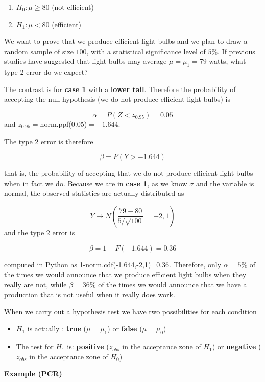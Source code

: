 \documentclass[
]{book}
\providecommand{\tightlist}{%
  \setlength{\itemsep}{0pt}\setlength{\parskip}{0pt}}
\begin{document}
\begin{enumerate}
\def\labelenumi{\alph{enumi}.}
\tightlist
\item
  \(H_0 : \mu \geq 80\) (not efficient)
\item
  \(H_1 : \mu < 80\) (efficient)
\end{enumerate}

We want to prove that we produce efficient light bulbs and we plan to draw a random sample of size \(100\), with a statistical significance level of \(5\%\). If previous studies have suggested that light bulbs may average \(\mu=\mu_1=79\) watts, what type 2 error do we expect?

The contrast is for \textbf{case 1} with a \textbf{lower tail}. Therefore the probability of accepting the null hypothesis (we do not produce efficient light bulbs) is

\[\alpha = P(Z< z_{0.95})=0.05\]
and \(z_{0.95}=\)norm.ppf(0.05)\(=-1.644\).

The type 2 error is therefore

\[\beta= P(Y > -1.644)\]

that is, the probability of accepting that we do not produce efficient light bulbs when in fact we do. Because we are in \textbf{case 1}, as we know \(\sigma\) and the variable is normal, the observed statistics are actually distributed as

\[Y \rightarrow N(\frac{79-80}{5/\sqrt{100}}=-2,1)\] and the type 2 error is

\[\beta = 1-F(-1.644)=0.36\]

computed in Python as 1-norm.cdf(-1.644,-2,1)=0.36. Therefore, only \(\alpha=5\%\) of the times we would announce that we produce efficient light bulbs when they really are not, while \(\beta=36\%\) of the times we would announce that we have a production that is not useful when it really does work.

When we carry out a hypothesis test we have two possibilities for each condition

\begin{itemize}
\tightlist
\item
  \(H_1\) is actually : \textbf{true} (\(\mu=\mu_1\)) or \textbf{false} (\(\mu=\mu_0\))
\item
  The test for \(H_1\) is: \textbf{positive} (\(z_{obs}\) in the acceptance zone of \(H_1\)) or \textbf{negative} (\(z_{obs}\) in the acceptance zone of \(H_0\))
\end{itemize}

\textbf{Example (PCR)}
\end{document}

